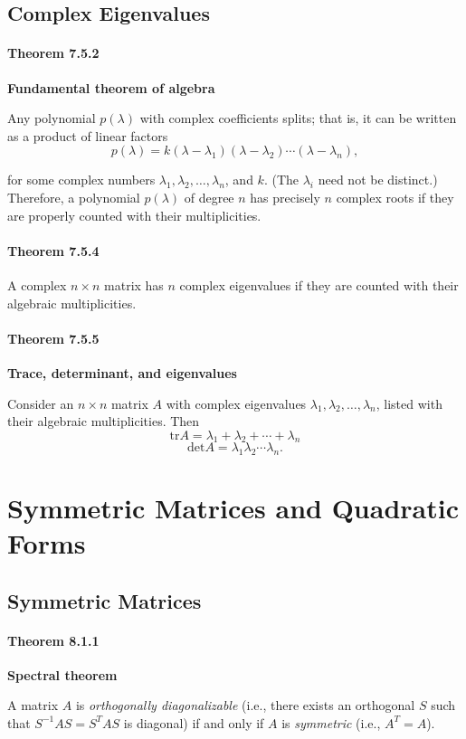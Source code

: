\documentclass{report}
\begin{document}
\section{Complex Eigenvalues}
\subsubsection*{Theorem 7.5.2}
\par\noindent\textbf{Fundamental theorem of algebra}
\par\noindent Any polynomial $p(\lambda{})$ with complex coefficients splits; that is, it can be written as a product of linear factors
\[p(\lambda{})=k(\lambda{}-\lambda{}_{1})(\lambda{}-\lambda{}_{2})\cdots{}(\lambda{}-\lambda{}_{n}),\]
\par\noindent for some complex numbers $\lambda{}_{1},\lambda{}_{2},\ldots{},\lambda{}_{n}$, and $k$. (The $\lambda{}_{i}$ need not be distinct.) Therefore, a polynomial $p(\lambda{})$ of degree $n$ has precisely $n$ complex roots if they are properly counted with their multiplicities.
\subsubsection*{Theorem 7.5.4}
\par\noindent A complex $n\times{}n$ matrix has $n$ complex eigenvalues if they are counted with their algebraic multiplicities.
\subsubsection*{Theorem 7.5.5}
\par\noindent\textbf{Trace, determinant, and eigenvalues}
\par\noindent Consider an $n\times{}n$ matrix $A$ with complex eigenvalues $\lambda{}_{1},\lambda{}_{2},\ldots{},\lambda{}_{n}$, listed with their algebraic multiplicities. Then
\[\textrm{tr}A=\lambda{}_{1}+\lambda{}_{2}+\cdots{}+\lambda{}_{n}\]
\[\textrm{det}A=\lambda{}_{1}\lambda{}_{2}\cdots{}\lambda{}_{n}.\]

\chapter{Symmetric Matrices and Quadratic Forms}

\section{Symmetric Matrices}
\subsubsection*{Theorem 8.1.1}
\par\noindent\textbf{Spectral theorem}
\par\noindent A matrix $A$ is \textit{orthogonally diagonalizable} (i.e., there exists an orthogonal $S$ such that $S^{-1}AS=S^{T}AS$ is diagonal) if and only if $A$ is \textit{symmetric} (i.e., $A^{T}=A$).
\end{document}
